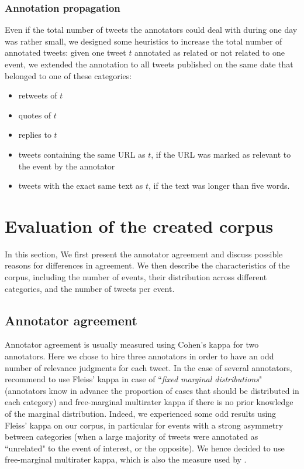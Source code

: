 		\subsubsection{Annotation propagation \label{Subsec: propagation}}

Even if the total number of tweets the annotators could deal with during one day was rather small, we designed some heuristics to increase the total number of annotated tweets: given one tweet $t$ annotated as related or not related to one event, we extended the annotation to all tweets published on the same date that belonged to one of these categories:
\begin{itemize}
\item retweets of $t$
\item quotes of $t$
\item replies to $t$
\item tweets containing the same URL as $t$, if the URL was marked as relevant to the event by the annotator
\item tweets with the exact same text as $t$, if the text was longer than five words.
\end{itemize}

\section{Evaluation of the created corpus}

In this section, We first present the annotator agreement and discuss possible reasons for differences in agreement. We then describe  the characteristics of the corpus, including the number of events, their distribution across different categories, and the number of tweets per event. 

	\subsection{Annotator agreement}

Annotator agreement is usually measured using Cohen's kappa for two annotators. Here we chose to hire three annotators in order to have an odd number of relevance judgments for each tweet. In the case of several annotators, \citet{randolph_free_2005} recommend to use Fleiss' kappa \citep{fleiss_measuring_1971} in case of ``\textit{fixed marginal distributions}" (annotators know in advance the proportion of cases that should be distributed in each category) and free-marginal multirater kappa \citep{randolph_free_2005} if there is no prior knowledge of the marginal distribution. Indeed, we experienced some odd results using Fleiss' kappa on our corpus, in particular for events with a strong asymmetry between categories (when a large majority of tweets were annotated as ``unrelated" to the event of interest, or the opposite). We hence decided to use free-marginal multirater kappa, which is also the measure used by \citet{mcminn_building_2013}.


